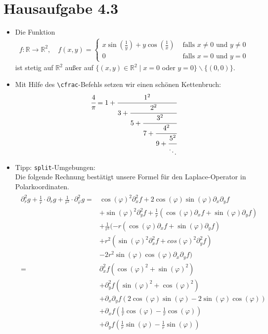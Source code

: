 \documentclass[11pt,a4paper]{scrartcl} %
\newcommand{\R}{\mathbb{R}}
\newcommand{\ph}{\varphi}
\newcommand{\p}{\partial}
\begin{document}
\section{Hausaufgabe 4.3}
\begin{itemize}
\item Die Funktion 
\begin{align*}
f : \R \to \R^2 , \quad f(x,y) = \begin{cases} 
x \sin(\frac{1}{y}) + y \cos(\frac{1}{x}) & \text{ falls } x \neq 0  \text{ und } y \neq 0 \\
0 & \text{ falls } x = 0 \text{ und } y = 0
\end{cases}
\end{align*}
ist stetig auf $\R^2$ außer auf $\{ ( x , y ) \in \R^2 \mid x = 0 $ oder $ y = 0 \} \backslash \{ ( 0 , 0 ) \}. $
\item Mit Hilfe des \texttt{\textbackslash cfrac}-Befehls setzen wir einen schönen Kettenbruch:
\begin{align*}
\cfrac{4}{\pi} = 1 + \cfrac{1^2}{3 + \cfrac{2^2}{5 + \cfrac{3^2}{7 + \cfrac{4^2}{9 + \cfrac{5^2}{\ddots}}}}}
\end{align*}
\item Tipp: \texttt{split}-Umgebungen: \\
Die folgende Rechnung bestätigt unsere Formel für den Laplace-Operator in Polarkoordinaten. 
\begin{align}
\begin{split}
\partial_r^2 g + \frac{1}{r} \cdot \partial_r g + \frac{1}{r^2} \cdot \partial_{\varphi}^2 g 
= &\cos(\varphi)^2 \partial_x^2 f + 2 \cos(\varphi) \sin(\varphi) \partial_x \partial_y f \\
&+ \sin(\ph)^2 \p_y^2 f + \frac{1}{r} ( \cos(\ph) \p_x f + \sin(\ph) \p_y f ) \\ 
&+ \frac{1}{r^2} ( -r ( \cos(\ph) \p_x f + \sin(\ph) \p_y f ) \\
&+ r^2 ( \sin(\ph)^2 \p_x^2 f + cos(\ph)^2 \p_y^2 f ) \\
&- 2 r^2 \sin(\ph) \cos(\ph) \p_x \p_y f ) \\
= & \p_x^2 f ( \cos(\ph)^2 + \sin(\ph)^2 ) \\
&+ \p_y^2 f ( \sin(\ph)^2 + \cos(\ph)^2 ) \\
&+ \p_x \p_y f ( 2 \cos(\ph) \sin(\ph) - 2 \sin(\ph) \cos(\ph) ) \\
&+ \p_x f ( \frac{1}{r} \cos(\ph) - \frac{1}{r} \cos(\ph) ) \\
&+ \p_y f ( \frac{1}{r} \sin(\ph) - \frac{1}{r} \sin(\ph) ) \\

\end{split}
\end{align}
\end{itemize}
\end{document}
